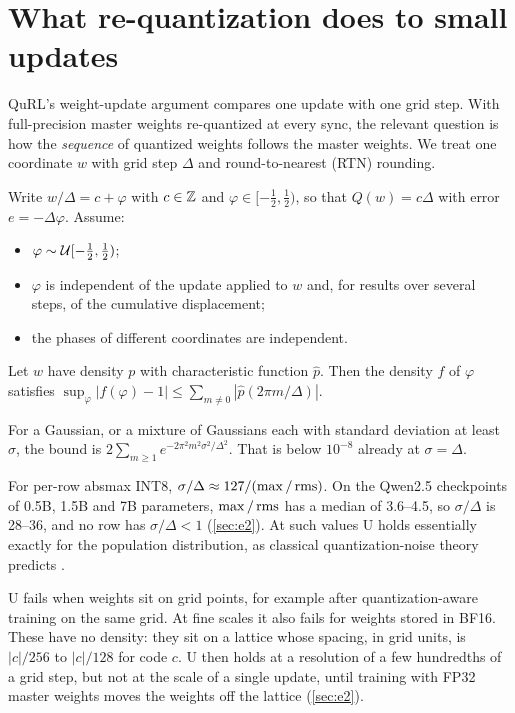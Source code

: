 \section{What re-quantization does to small updates}\label{sec:tracking}

QuRL's weight-update argument compares one update with one grid step. With full-precision master weights re-quantized at every sync, the relevant question is how the \emph{sequence} of quantized weights follows the master weights. We treat one coordinate $w$ with grid step $\Delta$ and round-to-nearest (RTN) rounding.

\begin{assumptionU}
Write $w/\Delta=c+\varphi$ with $c\in\mathbb{Z}$ and $\varphi\in[-\tfrac12,\tfrac12)$, so that $Q(w)=c\Delta$ with error $e=-\Delta\varphi$. Assume:
\begin{itemize}[leftmargin=*,itemsep=1pt]
\item $\varphi\sim\mathcal{U}[-\tfrac12,\tfrac12)$;
\item $\varphi$ is independent of the update applied to $w$ and, for results over several steps, of the cumulative displacement;
\item the phases of different coordinates are independent.
\end{itemize}
\end{assumptionU}

\begin{lemma}\label{lem:uniform-phase}
Let $w$ have density $p$ with characteristic function $\hat p$. Then the density $f$ of $\varphi$ satisfies $\sup_\varphi|f(\varphi)-1|\le\sum_{m\ne0}|\hat p(2\pi m/\Delta)|$.

For a Gaussian, or a mixture of Gaussians each with standard deviation at least $\sigma$, the bound is $2\sum_{m\ge1}e^{-2\pi^2m^2\sigma^2/\Delta^2}$. That is below $10^{-8}$ already at $\sigma=\Delta$.
\end{lemma}

For per-row absmax INT8, $\sigma/\Delta\approx127/(\max/\operatorname{rms})$. On the Qwen2.5 checkpoints of 0.5B, 1.5B and 7B parameters, $\max/\operatorname{rms}$ has a median of 3.6--4.5, so $\sigma/\Delta$ is 28--36, and no row has $\sigma/\Delta<1$ (\cref{sec:e2}). At such values U holds essentially exactly for the population distribution, as classical quantization-noise theory predicts \citep{widrow2008quantization,sripad1977necessary}.

U fails when weights sit on grid points, for example after quantization-aware training on the same grid. At fine scales it also fails for weights stored in BF16. These have no density: they sit on a lattice whose spacing, in grid units, is $|c|/256$ to $|c|/128$ for code $c$. U then holds at a resolution of a few hundredths of a grid step, but not at the scale of a single update, until training with FP32 master weights moves the weights off the lattice (\cref{sec:e2}).


